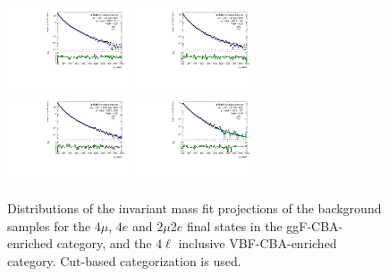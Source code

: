 \begin{figure}[htbp]
    \centering
    \includegraphics[width=0.32\textwidth]{figures/HMHZZ/background/cut_based/bkg_shape_qqZZ_ggF_4mu_190_to_2200_log.pdf}
    \includegraphics[width=0.32\textwidth]{figures/HMHZZ/background/cut_based/bkg_shape_qqZZ_ggF_4e_190_to_2200_log.pdf} \\
    \includegraphics[width=0.32\textwidth]{figures/HMHZZ/background/cut_based/bkg_shape_qqZZ_ggF_2mu2e_190_to_2200_log.pdf}
    \includegraphics[width=0.32\textwidth]{figures/HMHZZ/background/cut_based/bkg_shape_qqZZ_VBF_incl_190_to_2200_log.pdf}
    \caption{Distributions of the \mfl invariant mass fit projections of the \qqZZ background samples for the $4\mu$,
    $4e$ and $2\mu 2e$ final states in the ggF-CBA-enriched category, and the $4\ell$ inclusive VBF-CBA-enriched category.
    Cut-based categorization is used.} 
    \label{fig:qqZZ_m4l_shape_all_cut_based}
\end{figure}

